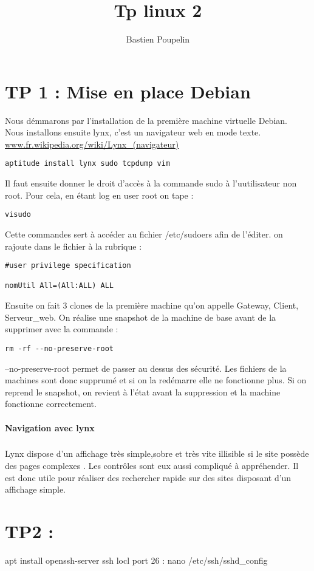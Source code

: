 \documentclass[a4paper,12pt]{article}
\title{Tp linux 2}
\author{Bastien Poupelin}
\begin{document}
\maketitle

\clearpage

\section{TP 1 : Mise en place Debian}

Nous démmarons par l'installation de la première machine virtuelle Debian.\\
Nous installons ensuite lynx, c'est un navigateur web en mode texte.
\url{www.fr.wikipedia.org/wiki/Lynx_(navigateur)}
\begin{verbatim}
aptitude install lynx sudo tcpdump vim
\end{verbatim}

Il faut ensuite donner le droit d'accès à la commande sudo à l'uutilisateur non root.
Pour cela, en étant log en user root on tape :
\begin{verbatim}
visudo
\end{verbatim}
Cette commandes sert à accéder au fichier /etc/sudoers afin de l'éditer.
on rajoute dans le fichier à la rubrique : 
\begin{verbatim}
#user privilege specification

nomUtil	All=(All:ALL) ALL
\end{verbatim}
Ensuite on fait 3 clones de la première machine qu'on appelle Gateway, Client, Serveur\_web.
On réalise une snapshot de la machine de base avant de la supprimer avec la commande :
\begin{verbatim}
rm -rf --no-preserve-root
\end{verbatim}
--no-preserve-root permet de passer au dessus des sécurité. Les fichiers de la machines sont donc supprumé et si on la redémarre elle ne fonctionne plus.
Si on reprend le snapshot, on revient à l'état avant la suppression et la machine fonctionne correctement.


\paragraph{Navigation avec lynx}
\subparagraph{}
Lynx dispose d'un affichage très simple,sobre et très vite illisible si le site possède des pages complexes . Les contrôles sont eux aussi compliqué à appréhender.
Il est donc utile pour réaliser des rechercher rapide sur des sites disposant d'un affichage simple.

\section{TP2 : }

apt install openssh-server
ssh locl
port 26 : nano /etc/ssh/sshd_config
\end{document}
